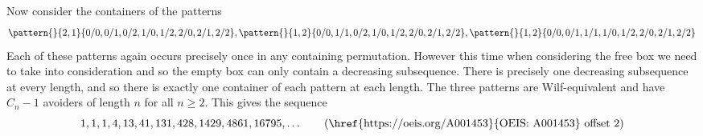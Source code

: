 \subsection{}
Now consider the containers of the patterns
\begin{equation*}
    \pattern{}{2,1}{0/0,0/1,0/2,1/0,1/2,2/0,2/1,2/2},
    \pattern{}{1,2}{0/0,1/1,0/2,1/0,1/2,2/0,2/1,2/2},
    \pattern{}{1,2}{0/0,0/1,1/1,1/0,1/2,2/0,2/1,2/2}
\end{equation*}
Each of these patterns again occurs precisely once in
any containing permutation. However this time when considering
the free box we need to take into consideration 
and so the empty box can only contain a decreasing subsequence. There
is precisely one decreasing subsequence at every length, and so there
is exactly one container of each pattern at each length. The three
patterns are Wilf-equivalent and have \(C_n - 1\) avoiders of
length \(n\) for all \(n \ge 2\).
This gives the sequence
\begin{equation*}
    1, 1, 1, 4, 13, 41, 131, 428, 1429, 4861, 16795,\dotsc\tag{\href{https://oeis.org/A001453}{OEIS: A001453} offset 2}
\end{equation*}

